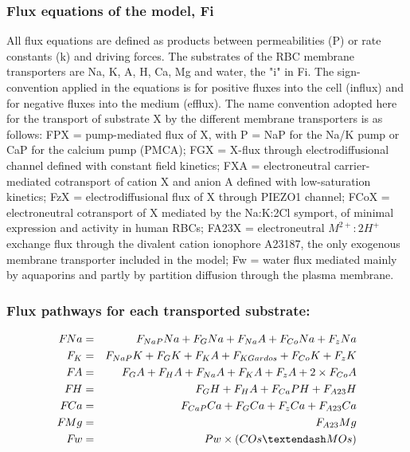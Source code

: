 \documentclass[a4paper]{article}
\newcommand{\med}[1]{M#1}
\newcommand{\cell}[1]{C#1}
\newcommand{\MOs}{\med{Os}}
\newcommand{\COs}{\cell{Os}}
\newcommand{\F}[2]{F_{#1}#2}
\begin{document}
\subsubsection{Flux equations of the model, Fi}
All flux equations are defined as products between permeabilities (P) or rate constants (k) and driving forces. The substrates of the RBC membrane transporters are Na, K, A, H, Ca, Mg and water, the "i" in Fi.  The sign-convention applied in the equations is for positive fluxes into the cell (influx) and for negative fluxes into the medium (efflux). The name convention adopted here for the transport of substrate X by the different membrane transporters is as follows: FPX = pump-mediated flux of X, with P = NaP for the Na/K pump or CaP for the calcium pump (PMCA); FGX = X-flux through electrodiffusional channel defined with constant field kinetics; FXA = electroneutral carrier-mediated cotransport of cation X and anion A defined with low-saturation kinetics; FzX = electrodiffusional flux of X through PIEZO1 channel; FCoX = electroneutral cotransport of X mediated by the Na:K:2Cl symport, of minimal expression and activity in human RBCs; FA23X = electroneutral $M^{2+}:2H^+$ exchange flux through the divalent cation ionophore A23187, the only exogenous membrane transporter included in the model; Fw = water flux mediated mainly by aquaporins and partly by partition diffusion through the plasma membrane.  

\setcounter{equation}{0}
\renewcommand{\theequation}{10.\alph{equation}}

\subsubsection{Flux pathways for each transported substrate:}
\begin{eqnarray}
\F{}{Na} &=& \F{NaP}{Na} + \F{G}{Na} + \F{Na}{A} + \F{Co}{Na} + \F{z}{Na}\\
\F{K} &=& \F{NaP}{K} + \F{G}{K} + \F{K}{A} + \F{KGardos} + \F{Co}{K} + \F{z}{K}\\
\F{}{A} &=& \F{G}{A} + \F{H}{A} + \F{Na}{A} + \F{K}{A} + \F{z}{A} + 2\times\F{Co}{A}\\
\F{}{H} &=& \F{G}{H} + \F{H}{A} + \F{Ca}{PH} + \F{A23}{H} \\
\F{}{Ca} &=& \F{CaP}{Ca} + \F{G}{Ca} + \F{z}{Ca} + \F{A23}{Ca} \\
\F{}{Mg} &=& \F{A23}{Mg} \\
\F{}{w}  &=& Pw\times (\COs – \MOs)
\end{eqnarray}
\end{document}
